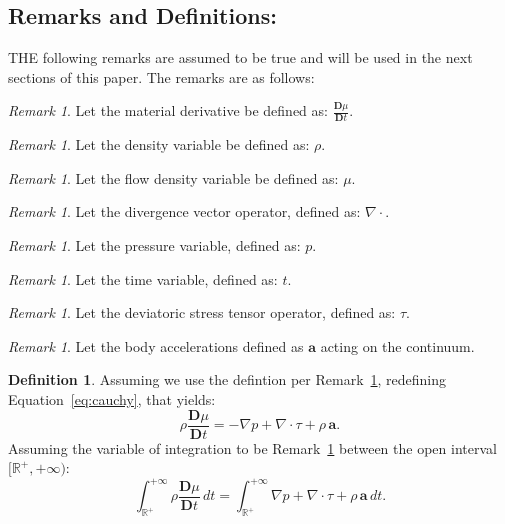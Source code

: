 \documentclass[10pt]{article}
\theoremstyle{plain}
\theoremstyle{definition}
\newtheorem{definition}[theorem]{Definition}
\theoremstyle{remark}
\newtheorem{remark}[theorem]{Remark}
\begin{document}
\subsection{Remarks and Definitions:}

\lettrine[lines=1, lhang=0.1, loversize=0.2]{T}HE following remarks are assumed to be true and will be used in the next sections of this paper. The remarks are as follows:

\begin{remark}
\label{rem:1}
  Let the material derivative be defined as: $\frac{\mathbf{D}\mu}{\mathbf{D}t}$.
\end{remark}
\begin{remark}
\label{rem:2}
  Let the density variable be defined as: $\rho$.
\end{remark}
\begin{remark}
\label{rem:3}
  Let the flow density variable be defined as: $\mu$.
\end{remark}
\begin{remark}
\label{rem:4}
  Let the divergence vector operator, defined as: $\nabla \cdot$.
\end{remark}
\begin{remark}
\label{rem:5}
  Let the pressure variable, defined as: $p$.
\end{remark}
\begin{remark}
\label{rem:6}
  Let the time variable, defined as: $t$.
\end{remark}
\begin{remark}
\label{rem:7}
  Let the deviatoric stress tensor operator, defined as: $\tau$.
\end{remark}
\begin{remark}
  Let the body accelerations defined as $\mathbf{a}$ acting on the continuum.
\end{remark}
\begin{definition}
Assuming we use the defintion per Remark~\ref{rem:7}, redefining Equation~\ref{eq:cauchy}, that yields:
\begin{equation}
  \rho \frac{\mathbf{D}\mu}{\mathbf{D}t} = - \nabla p + \nabla \cdot \tau + \rho \, \textbf{a}.
\end{equation}
Assuming the variable of integration to be Remark~\ref{rem:7} between the open interval $[\mathbb{R}^{+}, +\infty)$:
\begin{equation}
  \label{eq:integral:1}
  \int_{\mathbb{R}^{+}}^{+\infty} \rho \frac{\mathbf{D}\mu}{\mathbf{D}t} \, dt = \int_{\mathbb{R}^{+}}^{+\infty} \nabla p + \nabla \cdot \tau + \rho \, \textbf{a} \, dt.
\end{equation}
\end{definition}
\end{document}
